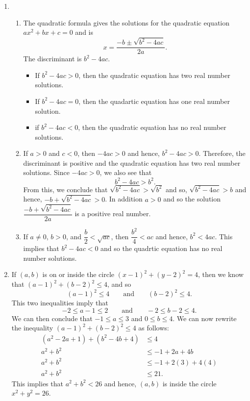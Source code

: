 \begin{enumerate}
\item \begin{enumerate}
\item The quadratic formula gives the solutions for the quadratic equation $ax^2 + bx + c = 0$ and is
\[
x = \frac{-b \pm \sqrt{b^2 - 4ac}}{2a}.
\]
The discriminant is $b^2 - 4ac$.
\begin{itemize}
  \item If $b^2 - 4ac > 0$, then the quadratic equation has two real number solutions.
  \item If $b^2 - 4ac = 0$, then the quadartic equation has one real number solution.
  \item if $b^2 - 4ac < 0$, then the quadratic equation has no real number solutions.
\end{itemize}

\item If $a > 0$ and $c < 0$, then $-4ac > 0$ and hence, $b^2 - 4ac > 0$.  Therefore, the discriminant is positive and the quadratic equation has two real number solutions.  Since $-4ac > 0$, we also see that
\[
b^2 - 4ac > b^2.
\]
From this, we conclude that $\sqrt{b^2 - 4ac} > \sqrt{b^2}$ and so, $\sqrt{b^2 - 4ac} > b$ and hence, 
$-b + \sqrt{b^2 - 4ac} > 0$.  In addition $a > 0$ and so the solution $\dfrac{-b + \sqrt{b^2 - 4ac}}{2a}$ is a positive real number.

\item If $a \ne 0$, $b > 0$, and $\dfrac{b}{2} < \sqrt{ac}$, then $\dfrac{b^2}{4} < ac$ and hence, $b^2 < 4ac$.  This implies that $b^2 - 4ac < 0$ and so the quadrtic equation has no real number solutions.
\end{enumerate}


\item If $(a, b)$ is on or inside the circle $(x - 1)^2 + (y - 2)^2 = 4$, then we know that 
$(a - 1)^2 + (b - 2)^2 \leq 4$, and so 
\[
(a - 1)^2 \leq 4 \qquad \text{and} \qquad (b - 2)^2 \leq 4.  
\]
This two inequalities imply that
\[
-2 \leq a - 1 \leq 2 \qquad \text{and} \qquad -2 \leq b - 2 \leq 4.
\]
We can then conclude that $-1 \leq a \leq 3$ and $0 \leq b \leq 4$.  We can now rewrite the inequality $(a - 1)^2 + (b - 2)^2 \leq 4$ as follows:
\begin{align*}
(a^2 - 2a + 1) + (b^2 - 4b + 4) &\leq 4 \\
a^2 + b^2 &\leq -1 + 2a + 4b \\
a^2 + b^2 &\leq -1 + 2(3) + 4(4) \\
a^2 + b^2 &\leq 21.
\end{align*}
This implies that $a^2 + b^2 < 26$ and hence, $(a, b)$ is inside the circle $x^2 + y^2 = 26$.





\end{enumerate}
